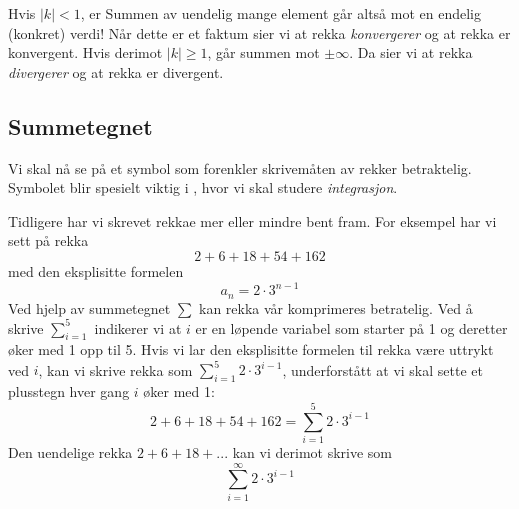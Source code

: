 Hvis $ {|k|<1} $, er
Summen av uendelig mange element går altså mot en endelig (konkret) verdi! Når dette er et faktum sier vi at rekka \textit{konvergerer} og at rekka er konvergent. Hvis derimot $ |k|\geq 1$, går summen mot $ \pm \infty$. Da sier vi at rekka \textit{divergerer} og at rekka er divergent.\regv
{}
\newpage
{}
\newpage
\subsection{Summetegnet}
Vi skal nå se på et symbol som forenkler skrivemåten av rekker betraktelig. Symbolet blir spesielt viktig i , hvor vi skal studere \textit{integrasjon}.\vsk

Tidligere har vi skrevet rekkae mer eller mindre bent fram. For eksempel har vi sett på rekka
\[ 2+6+18+54+162 \]
med den eksplisitte formelen
\[ a_n = 2\cdot3^{n-1} \]
Ved hjelp av summetegnet $ \sum $ kan rekka vår komprimeres betratelig. Ved å skrive $ \sum\limits_{i=1}^5 $ indikerer vi at $ i $ er en løpende variabel som starter på 1 og deretter øker med 1 opp til 5. Hvis vi lar den eksplisitte formelen til rekka være uttrykt ved $ i $, kan vi skrive rekka som $ \sum\limits_{i=1}^5 2\cdot3^{i-1} $, underforstått at vi skal sette et plusstegn hver gang $ i $ øker med 1:
\[ 2+6+18+54+162=\sum\limits_{i=1}^5 2\cdot3^{i-1} \]
Den uendelige rekka 
$ 2+6+18+... $ kan vi derimot skrive som
\[ \sum\limits_{i=1}^\infty 2\cdot3^{i-1} \]

